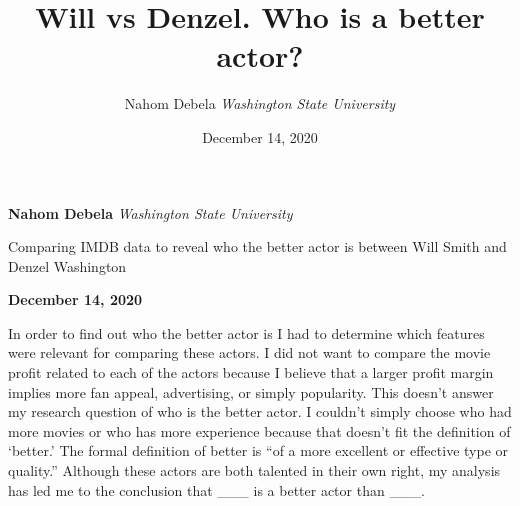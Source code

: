 \documentclass[]{article}
\title{\textbf{\textcolor{WSU.crimson}{Will vs
Denzel.}} \newline \textbf{\textcolor{WSU.gray}{Who is a better
actor?}}  }
\author{\Large Nahom
Debela\vspace{0.05in} \newline\normalsize\emph{Washington State
University}  }
\date{December 14, 2020}
\newcommand*{\authorfont}{\fontfamily{phv}\selectfont}
\renewenvironment{abstract}
 {{%
    \setlength{\leftmargin}{0mm}
    \setlength{\rightmargin}{\leftmargin}%
  }%
  \relax}
 {\endlist}
\begin{document}
	
%    


{%
\setlength{\parindent}{0pt}
\thispagestyle{plain}
{\fontsize{18}{20}\selectfont\raggedright 
\maketitle  %

}

{
   \vskip 13.5pt\relax \normalsize\fontsize{11}{12} 
   
\textbf{\authorfont Nahom Debela} \hskip 15pt \emph{\small Washington
State University}   

}

}








\begin{abstract}

    \hbox{\vrule height .2pt width 39.14pc}

    \vskip 8.5pt %

\noindent \noindent Comparing IMDB data to reveal who the better actor
is between Will Smith and Denzel Washington \vspace{0.12in}


    



    
    \hbox{\vrule height .2pt width 39.14pc}
    \vskip 5pt 
    \hfill \textbf{\textcolor{WSU.gray}{ December 14, 2020 } }
    \vskip 5pt 
    
\end{abstract}


\vskip -8.5pt




\noindent  

\vspace{5mm}

\noindent In order to find out who the better actor is I had to
determine which features were relevant for comparing these actors. I did
not want to compare the movie profit related to each of the actors
because I believe that a larger profit margin implies more fan appeal,
advertising, or simply popularity. This doesn't answer my research
question of who is the better actor. I couldn't simply choose who had
more movies or who has more experience because that doesn't fit the
definition of `better.' The formal definition of better is ``of a more
excellent or effective type or quality.'' Although these actors are both
talented in their own right, my analysis has led me to the conclusion
that \_\_\_ is a better actor than \_\_\_.
\end{document}
